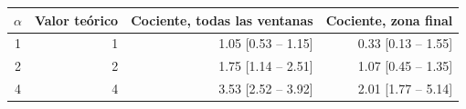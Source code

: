 \begin{tabular}{crrr}
\toprule
\textbf{$\alpha$} & \textbf{Valor teórico} & \textbf{Cociente, todas las ventanas} & \textbf{Cociente, zona final} \\
\midrule
1 & 1 & 1.05 [0.53 – 1.15] & 0.33 [0.13 – 1.55] \\
2 & 2 & 1.75 [1.14 – 2.51] & 1.07 [0.45 – 1.35] \\
4 & 4 & 3.53 [2.52 – 3.92] & 2.01 [1.77 – 5.14] \\
\bottomrule
\end{tabular}
